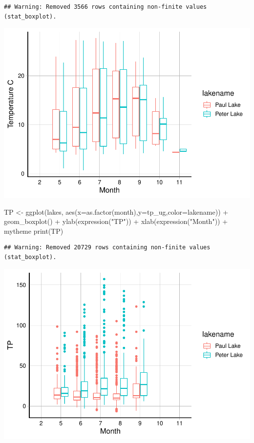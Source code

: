 \documentclass[
]{article}
\newenvironment{Shaded}{\begin{snugshade}}{\end{snugshade}}
\newcommand{\AttributeTok}[1]{\textcolor[rgb]{0.77,0.63,0.00}{#1}}
\newcommand{\FunctionTok}[1]{\textcolor[rgb]{0.00,0.00,0.00}{#1}}
\newcommand{\NormalTok}[1]{#1}
\newcommand{\OtherTok}[1]{\textcolor[rgb]{0.56,0.35,0.01}{#1}}
\newcommand{\SpecialCharTok}[1]{\textcolor[rgb]{0.00,0.00,0.00}{#1}}
\newcommand{\StringTok}[1]{\textcolor[rgb]{0.31,0.60,0.02}{#1}}
\begin{document}
\begin{verbatim}
## Warning: Removed 3566 rows containing non-finite values (stat_boxplot).
\end{verbatim}

\includegraphics{A05_DataVisualization_files/figure-latex/unnamed-chunk-4-1.pdf}

\begin{Shaded}
\begin{Highlighting}[]
\NormalTok{TP }\OtherTok{\textless{}{-}} \FunctionTok{ggplot}\NormalTok{(lakes, }\FunctionTok{aes}\NormalTok{(}\AttributeTok{x=}\FunctionTok{as.factor}\NormalTok{(month),}\AttributeTok{y=}\NormalTok{tp\_ug,}\AttributeTok{color=}\NormalTok{lakename)) }\SpecialCharTok{+} 
  \FunctionTok{geom\_boxplot}\NormalTok{() }\SpecialCharTok{+} 
  \FunctionTok{ylab}\NormalTok{(}\FunctionTok{expression}\NormalTok{(}\StringTok{"TP"}\NormalTok{)) }\SpecialCharTok{+}
  \FunctionTok{xlab}\NormalTok{(}\FunctionTok{expression}\NormalTok{(}\StringTok{"Month"}\NormalTok{)) }\SpecialCharTok{+} 
\NormalTok{  mytheme }
\FunctionTok{print}\NormalTok{(TP)}
\end{Highlighting}
\end{Shaded}

\begin{verbatim}
## Warning: Removed 20729 rows containing non-finite values (stat_boxplot).
\end{verbatim}

\includegraphics{A05_DataVisualization_files/figure-latex/unnamed-chunk-4-2.pdf}
\end{document}
